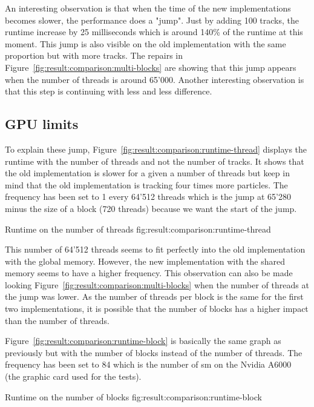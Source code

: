 An interesting observation is that when the time of the new implementations
becomes slower, the performance does a "jump".
Just by adding 100 tracks, the runtime increase by 25 milliseconds which is
around 140\% of the runtime at this moment.
This jump is also visible on the old implementation with the same proportion but
with more tracks.
The repairs in Figure~\ref{fig:result:comparison:multi-blocks} are showing that
this jump appears when the number of threads is around 65'000.
Another interesting observation is that this step is continuing with less and
less difference.

\subsection{GPU limits}
\label{ch:result:comparison:gpu}

To explain these jump, Figure~\ref{fig:result:comparison:runtime-thread}
displays the runtime with the number of threads and not the number of tracks.
It shows that the old implementation is slower for a given a number of
threads but keep in mind that the old implementation is tracking four times
more particles.
The frequency has been set to 1 every 64'512 threads which is the jump at 65'280 minus
the size of a block (720 threads) because we want the start of the jump.

{Runtime on the number of threads}
{fig:result:comparison:runtime-thread}

This number of 64'512 threads seems to fit perfectly into the old implementation
with the global memory.
However, the new implementation with the shared memory seems to have a higher
frequency.
This observation can also be made looking Figure~\ref{fig:result:comparison:multi-blocks}
when the number of threads at the jump was lower.
As the number of threads per block is the same for the first two implementations,
it is possible that the number of blocks has a higher impact than the number of
threads.

Figure~\ref{fig:result:comparison:runtime-block} is basically the same graph as
previously but with the number of blocks instead of the number of threads.
The frequency has been set to 84 which is the number of \acrshort{sm} on the
Nvidia A6000~\cite{nvidia-a6000} (the graphic card used for the tests).

{Runtime on the number of blocks}
{fig:result:comparison:runtime-block}

